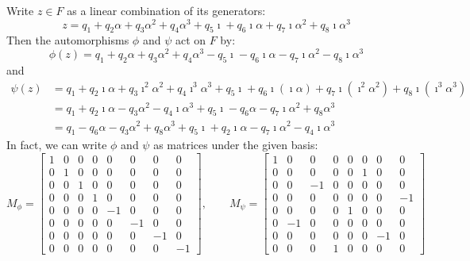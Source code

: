 Write $z \in F$ as a linear combination of its generators: \[z = q_1 + q_2 \alpha + q_3 \alpha^2 + q_4 \alpha^3 + q_5 \imath + q_6 \imath\alpha + q_7 \imath\alpha^2 + q_8 \imath\alpha^3\] Then the automorphisms $\phi$ and $\psi$ act on $F$ by: \[\phi(z) = q_1 + q_2 \alpha + q_3 \alpha^2 + q_4 \alpha^3 - q_5 \imath - q_6 \imath\alpha - q_7 \imath\alpha^2 - q_8 \imath\alpha^3\] and
\begin{align*}
	\psi(z) &= q_1 + q_2 \imath\alpha + q_3 \imath^2\alpha^2 + q_4 \imath^3\alpha^3 + 
						 q_5 \imath + q_6 \imath(\imath\alpha) + q_7 \imath(\imath^2\alpha^2) + q_8 \imath(\imath^3\alpha^3) \\
					&= q_1 + q_2 \imath\alpha - q_3 \alpha^2 - q_4 \imath\alpha^3 + q_5 \imath - q_6 \alpha - q_7 \imath\alpha^2 + q_8 \alpha^3 \\
					&= q_1 - q_6 \alpha - q_3 \alpha^2 + q_8 \alpha^3 + q_5 \imath + q_2 \imath\alpha - q_7 \imath\alpha^2 - q_4 \imath\alpha^3
\end{align*}
In fact, we can write $\phi$ and $\psi$ as matrices under the given basis:
\[
	M_\phi = \begin{bmatrix}  1 &  0 &  0 &  0 &  0 &  0 &  0 &  0 \\ 
														0 &  1 &  0 &  0 &  0 &  0 &  0 &  0 \\ 
														0 &  0 &  1 &  0 &  0 &  0 &  0 &  0 \\ 
														0 &  0 &  0 &  1 &  0 &  0 &  0 &  0 \\ 
														0 &  0 &  0 &  0 & -1 &  0 &  0 &  0 \\ 
														0 &  0 &  0 &  0 &  0 & -1 &  0 &  0 \\ 
														0 &  0 &  0 &  0 &  0 &  0 & -1 &  0 \\ 
														0 &  0 &  0 &  0 &  0 &  0 &  0 & -1 \end{bmatrix},
\qquad %
	M_\psi = \begin{bmatrix}  1 &  0 &  0 &  0 &  0 &  0 &  0 &  0 \\
														0 &  0 &  0 &  0 &  0 &  1 &  0 &  0 \\ 
														0 &  0 & -1 &  0 &  0 &  0 &  0 &  0 \\ 
														0 &  0 &  0 &  0 &  0 &  0 &  0 & -1 \\ 
														0 &  0 &  0 &  0 &  1 &  0 &  0 &  0 \\ 
														0 & -1 &  0 &  0 &  0 &  0 &  0 &  0 \\ 
														0 &  0 &  0 &  0 &  0 &  0 & -1 &  0 \\ 
														0 &  0 &  0 &  1 &  0 &  0 &  0 &  0 \end{bmatrix}
\]

